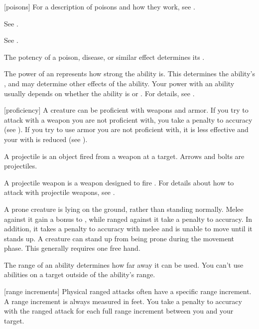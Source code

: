 [poisons] For a description of poisons and how they work, see .

 See .

 See .

 The potency of a poison, disease, or similar effect determines its .

 The power of an  represents how strong the ability is.
This determines the ability's , and may determine other effects of the ability.
Your power with an ability usually depends on whether the ability is  or .
For details, see .

[proficiency] A creature can be proficient with weapons and armor.
If you try to attack with a weapon you are not proficient with, you take a  penalty to accuracy (see ).
If you try to use armor you are not proficient with, it is less effective and your  with  is reduced (see ).

 A projectile is an object fired from a weapon at a target.
Arrows and bolts are projectiles.

 A projectile weapon is a weapon designed to fire .
For details about how to attack with projectile weapons, see .

 A prone creature is lying on the ground, rather than standing normally.
Melee  against it gain a  bonus to , while ranged  against it take a  penalty to accuracy.
In addition, it takes a  penalty to accuracy with melee  and is unable to move until it stands up.
A creature can stand up from being prone during the movement phase.
This generally requires one free hand.

 The range of an ability determines how far away it can be used.
You can't use abilities on a target outside of the ability's range.

[range increments] Physical ranged attacks often have a specific range increment.
A range increment is always measured in feet.
You take a  penalty to accuracy with the ranged attack for each full range increment between you and your target.

